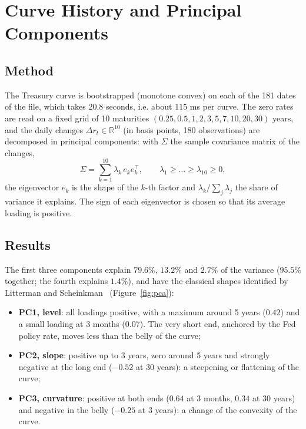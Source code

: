 \documentclass[11pt,a4paper]{article}
\theoremstyle{plain}
\theoremstyle{definition}
\newcommand{\R}{\mathbb{R}}
\begin{document}
\clearpage
\section{Curve History and Principal Components}
\label{sec:pca}

\subsection{Method}
The Treasury curve is bootstrapped (monotone convex) on each of the 181 dates of the file, which takes $20.8$ seconds, i.e. about $115$ ms per curve. The zero rates are read on a fixed grid of 10 maturities $(0.25,0.5,1,2,3,5,7,10,20,30)$ years, and the daily changes $\Delta r_t\in\R^{10}$ (in basis points, 180 observations) are decomposed in principal components: with $\Sigma$ the sample covariance matrix of the changes,
\begin{equation}
    \Sigma=\sum_{k=1}^{10}\lambda_k\,e_ke_k^\top,\qquad \lambda_1\ge\dots\ge\lambda_{10}\ge0,
\end{equation}
the eigenvector $e_k$ is the shape of the $k$-th factor and $\lambda_k/\sum_j\lambda_j$ the share of variance it explains. The sign of each eigenvector is chosen so that its average loading is positive.

\subsection{Results}
The first three components explain $79.6\%$, $13.2\%$ and $2.7\%$ of the variance ($95.5\%$ together; the fourth explains $1.4\%$), and have the classical shapes identified by Litterman and Scheinkman~\cite{litterman} (Figure~\ref{fig:pca}):
\begin{itemize}
    \item \textbf{PC1, level}: all loadings positive, with a maximum around 5 years ($0.42$) and a small loading at 3 months ($0.07$). The very short end, anchored by the Fed policy rate, moves less than the belly of the curve;
    \item \textbf{PC2, slope}: positive up to 3 years, zero around 5 years and strongly negative at the long end ($-0.52$ at 30 years): a steepening or flattening of the curve;
    \item \textbf{PC3, curvature}: positive at both ends ($0.64$ at 3 months, $0.34$ at 30 years) and negative in the belly ($-0.25$ at 3 years): a change of the convexity of the curve.
\end{itemize}
\end{document}
